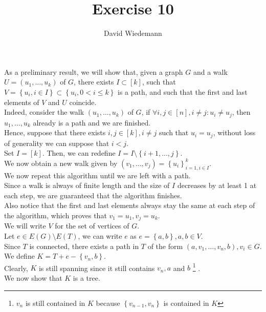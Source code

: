 \documentclass[11pt, a4paper]{article}
\begin{document}
\title{Exercise 10}
\author{David Wiedemann}
\maketitle
As a preliminary result, we will show that, given a graph $G$ and a walk $U=( u_1, \ldots, u_k) $ of $G$, there exists $I \subset [ k] $, such that   $ V=\left\{ u_i, i \in I \right\} \subset \left\{ u_i, 0 <i \leq k \right\} $ is a path, and such that the first and last elements of $V$ and $U$ coincide.\\

Indeed, consider the walk $( u_1, \ldots, u_k) $ of $G$, if $\forall i,j \in [ n] , i\neq j: u_i \neq u_j$, then $u_1, \ldots, u_k$ already is a path and we are finished.\\
Hence, suppose that there exists $i,j \in [ k] , i\neq j$ such that $u_i = u_j$, without loss of generality we can suppose that $i<j$.\\
Set $I= [ k] $.
Then, we can redefine  $I = I\setminus \left\{ i+1, \ldots, j \right\} $.\\
We now obtain a new walk given by $ ( v_1, \ldots, v_j) = \left\{ u_i \right\}_{i=1, i \in I} ^{k}$.\\
We now repeat this algorithm until we are left with a path.\\
Since a walk is always of finite length and the size of $I$ decreases by at least 1 at each step, we are guaranteed that the algorithm finishes.\\
Also notice that the first and last elements always stay the same at each step of the algorithm, which proves that $v_1= u_1, v_j = u_k$.\\
\hr
We will write $V $ for the set of vertices of  $G$.\\
Let $e \in E( G) \setminus E( T) $, we can write $e$ as $e= \left\{ a,b \right\} , a,b \in V$.\\
Since $T$ is connected, there exists a path in $T$ of the form $(a, v_1, \ldots, v_n,b), v_i \in G $.\\
We define $ K = T + e - \left\{ v_n,b \right\} $.\\
Clearly, $K$ is still spanning since it still contains $v_n, a $ and $b$ \footnote { $v_n$ is still contained in $K$ because $ \left\{ v_{n-1} , v_n \right\} $ is contained in $K$} .\\
We now show that $K$ is a tree.\\
\end{document}
